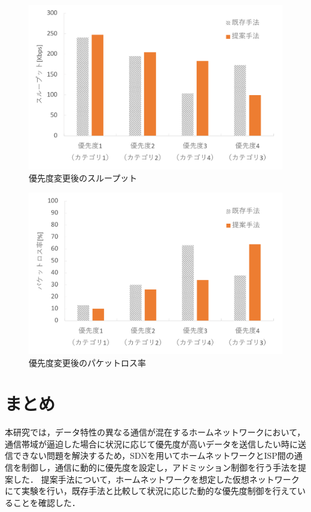 \documentclass[a4paper,10pt,twocolumn,uplatex]{jsarticle}
\begin{document}
\begin{figure}[t]
	\begin{centering}
    \includegraphics[width=0.9\linewidth]{img/throughput_resume3.pdf}
    \caption{優先度変更後のスループット}
    \label{fig:throughput}
    \end{centering}
\end{figure}

\begin{figure}[t]
	\begin{centering}
    \includegraphics[width=0.9\linewidth]{img/packetloss_resume3.pdf}
    \caption{優先度変更後のパケットロス率}
    \label{fig:packetloss}
    \end{centering}
\end{figure}

\section{まとめ}
本研究では，データ特性の異なる通信が混在するホームネットワークにおいて，通信帯域が逼迫した場合に状況に応じて優先度が高いデータを送信したい時に送信できない問題を解決するため，SDNを用いてホームネットワークとISP間の通信を制御し，通信に動的に優先度を設定し，アドミッション制御を行う手法を提案した．
提案手法について，ホームネットワークを想定した仮想ネットワークにて実験を行い，既存手法と比較して状況に応じた動的な優先度制御を行えていることを確認した．
\end{document}
